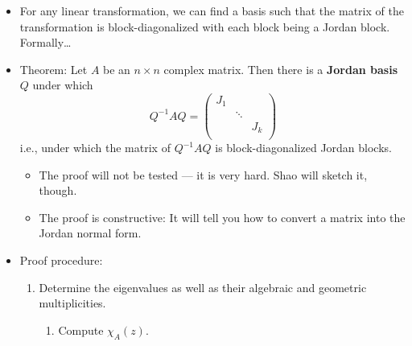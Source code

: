 \documentclass[../notes.tex]{subfiles}
\begin{document}
\begin{itemize}
    \item For any linear transformation, we can find a basis such that the matrix of the transformation is block-diagonalized with each block being a Jordan block. Formally\dots
    \item Theorem: Let $A$ be an $n\times n$ complex matrix. Then there is a \textbf{Jordan basis} $Q$ under which
    \begin{equation*}
        Q^{-1}AQ =
        \begin{pmatrix}
            J_1 &  & \\
             & \ddots & \\
             &  & J_k\\
        \end{pmatrix}
    \end{equation*}
    i.e., under which the matrix of $Q^{-1}AQ$ is block-diagonalized Jordan blocks.
    \begin{itemize}
        \item The proof will not be tested --- it is very hard. Shao will sketch it, though.
        \item The proof is constructive: It will tell you how to convert a matrix into the Jordan normal form.
    \end{itemize}
    \item Proof procedure:
    \begin{enumerate}
        \item Determine the eigenvalues as well as their algebraic and geometric multiplicities.
        \begin{enumerate}
            \item Compute $\chi_A(z)$.

\end{enumerate}
\end{enumerate}
\end{itemize}
\end{document}

